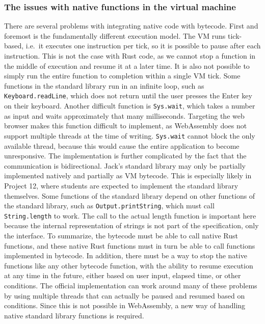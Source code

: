 \subsubsection{The issues with native functions in the virtual machine} \label{stdlib-issues}
There are several problems with integrating native code with bytecode.
First and foremost is the fundamentally different execution model.
The VM runs tick-based, i.e.\ it executes one instruction per tick, so it is possible to pause after each instruction.
This is not the case with Rust code, as we cannot stop a function in the middle of execution and resume it at a later time.
It is also not possible to simply run the entire function to completion within a single VM tick.
Some functions in the standard library run in an infinite loop, such as \verb+Keyboard.readLine+, which does not return until the user presses the Enter key on their keyboard.
Another difficult function is \verb+Sys.wait+, which takes a number as input and waits approximately that many milliseconds.
Targeting the web browser makes this function difficult to implement, as WebAssembly does not support multiple threads at the time of writing.
\verb+Sys.wait+ cannot block the only available thread, because this would cause the entire application to become unresponsive.
The implementation is further complicated by the fact that the communication is bidirectional.
Jack's standard library may only be partially implemented natively and partially as VM bytecode.
This is especially likely in Project 12, where students are expected to implement the standard library themselves.
Some functions of the standard library depend on other functions of the standard library, such as \verb+Output.printString+, which must call \verb+String.length+ to work.
The call to the actual length function is important here because the internal representation of strings is not part of the specification, only the interface.
To summarize, the bytecode must be able to call native Rust functions, and these native Rust functions must in turn be able to call functions implemented in bytecode.
In addition, there must be a way to stop the native functions like any other bytecode function, with the ability to resume execution at any time in the future, either based on user input, elapsed time, or other conditions.
The official implementation can work around many of these problems by using multiple threads that can actually be paused and resumed based on conditions.
Since this is not possible in WebAssembly, a new way of handling native standard library functions is required.

